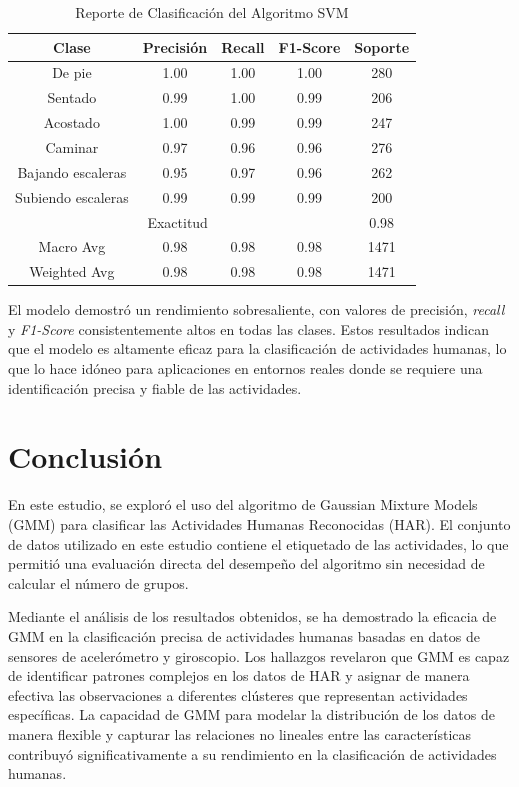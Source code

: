 \documentclass{esannV2}
\begin{document}
\begin{table}[h]
    \centering
    \begin{tabular}{|c|c|c|c|c|}
        \hline
        \textbf{Clase} & \textbf{Precisión} & \textbf{Recall} & \textbf{F1-Score} & \textbf{Soporte} \\ \hline
        De pie & 1.00 & 1.00 & 1.00 & 280 \\ \hline
        Sentado & 0.99 & 1.00 & 0.99 & 206 \\ \hline
        Acostado & 1.00 & 0.99 & 0.99 & 247 \\ \hline
        Caminar & 0.97 & 0.96 & 0.96 & 276 \\ \hline
        Bajando escaleras & 0.95 & 0.97 & 0.96 & 262 \\ \hline
        Subiendo escaleras & 0.99 & 0.99 & 0.99 & 200 \\ \hline
        \multicolumn{4}{|c|}{Exactitud} & 0.98 \\ \hline
        \multicolumn{1}{|c|}{Macro Avg} & 0.98 & 0.98 & 0.98 & 1471 \\ \hline
        \multicolumn{1}{|c|}{Weighted Avg} & 0.98 & 0.98 & 0.98 & 1471 \\ \hline
    \end{tabular}
    \caption{Reporte de Clasificación del Algoritmo SVM}
    \label{tab:classification_report}
\end{table}

El modelo demostró un rendimiento sobresaliente, con valores de precisión, \textit{recall} y \textit{F1-Score} consistentemente altos en todas las clases. Estos resultados indican que el modelo es altamente eficaz para la clasificación de actividades humanas, lo que lo hace idóneo para aplicaciones en entornos reales donde se requiere una identificación precisa y fiable de las actividades.

\section{Conclusión}
En este estudio, se exploró el uso del algoritmo de Gaussian Mixture Models (GMM) para clasificar las Actividades Humanas Reconocidas (HAR). El conjunto de datos utilizado en este estudio contiene el etiquetado de las actividades, lo que permitió una evaluación directa del desempeño del algoritmo sin necesidad de calcular el número de grupos.

Mediante el análisis de los resultados obtenidos, se ha demostrado la eficacia de GMM en la clasificación precisa de actividades humanas basadas en datos de sensores de acelerómetro y giroscopio. Los hallazgos revelaron que GMM es capaz de identificar patrones complejos en los datos de HAR y asignar de manera efectiva las observaciones a diferentes clústeres que representan actividades específicas. La capacidad de GMM para modelar la distribución de los datos de manera flexible y capturar las relaciones no lineales entre las características contribuyó significativamente a su rendimiento en la clasificación de actividades humanas.
\end{document}
